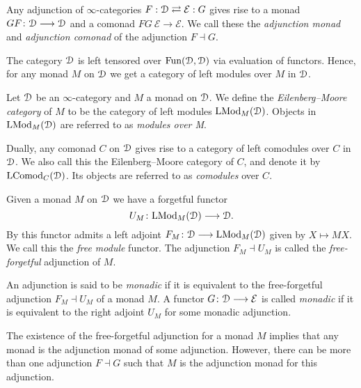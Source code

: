 \begin{example}
    Any adjunction of $\infty$-categories $F:\EuScript{D}\rightleftarrows \mathcal{E}:G$ gives rise to a monad $GF\colon \EuScript{D}\longrightarrow \EuScript{D}$ and a comonad $FG\:\mathcal{E}\to \mathcal{E}$. We call these the \emph{adjunction monad} and \emph{adjunction comonad} of the adjunction $F\dashv G$. 
\end{example}

The category $\EuScript{D}$ is left tensored over $\operatorname{Fun}(\EuScript{D}, \EuScript{D})$ via evaluation of functors. Hence, for any monad $M$ on $\EuScript{D}$ we get a category of left modules over $M$ in $\EuScript{D}$. 

\begin{definition}
    Let $\EuScript{D}$ be an $\infty$-category and $M$ a monad on $\EuScript{D}$. We define the \emph{Eilenberg--Moore category} of $M$ to be the category of left modules $\mathrm{LMod}_M(\EuScript{D})$. Objects in $\mathrm{LMod}_M(\EuScript{D})$ are referred to as \emph{modules over M}. 
\end{definition}

\begin{remark}
    Dually, any comonad $C$ on $\EuScript{D}$ gives rise to a category of left comodules over $C$ in $\EuScript{D}$. We also call this the Eilenberg--Moore category of $C$, and denote it by $\mathrm{LComod}_C(\EuScript{D})$. Its objects are referred to as \emph{comodules} over $C$. 
\end{remark}

Given a monad $M$ on $\EuScript{D}$ we have a forgetful functor 
\[U_M\colon \mathrm{LMod}_M(\EuScript{D})\longrightarrow \EuScript{D}.\] 
By \cite[4.2.4.8]{Lurie_HA} this functor admits a left adjoint $F_M\colon \EuScript{D}\longrightarrow \mathrm{LMod}_M(\EuScript{D})$ given by $X\longmapsto MX$. We call this the \emph{free module} functor. The adjunction $F_M\dashv U_M$ is called the \emph{free-forgetful} adjunction of $M$. 

\begin{definition}
    An adjunction is said to be \emph{monadic} if it is equivalent to the free-forgetful adjunction $F_M\dashv U_M$ of a monad $M$. A functor $G\colon \EuScript{D}\longrightarrow \mathcal{E}$ is called \emph{monadic} if it is equivalent to the right adjoint $U_M$ for some monadic adjunction. 
\end{definition}

The existence of the free-forgetful adjunction for a monad $M$ implies that any monad is the adjunction monad of some adjunction. However, there can be more than one adjunction $F\dashv G$ such that $M$ is the adjunction monad for this adjunction.

